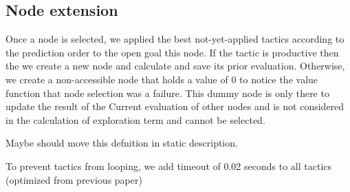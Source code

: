 \documentclass[runningheads,a4paper,draft]{svjour3}
\begin{document}
\subsection{Node extension}
Once a node is selected, we applied the best not-yet-applied tactics according 
to the prediction order to the open goal this node. If the tactic is productive 
then the we create a new 
node and calculate and save its prior evaluation. Otherwise, we create a 
non-accessible node that holds a value of 0 to notice the value function that 
node selection was a failure. This dummy node is only there to update the 
result of the Current evaluation of other nodes and is not considered in the 
calculation of exploration term and cannot be selected.

Maybe should move this defnition in static description.

To prevent tactics from looping, we add timeout of 0.02 seconds to all tactics 
(optimized from previous paper)
\end{document}
